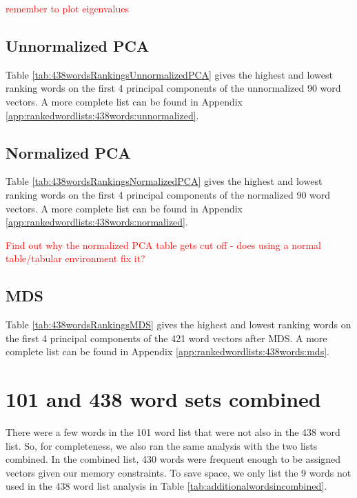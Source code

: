 \documentclass[10pt,letterpaper]{book}
\newcommand{\todo}[1]{\textcolor{red}{#1}}
\begin{document}
\todo{remember to plot eigenvalues}

\subsection{Unnormalized PCA}



Table \ref{tab:438wordsRankingsUnnormalizedPCA} gives the highest and lowest
ranking words on the first 4 principal components of the unnormalized 90 word 
vectors. A more complete list can be found in Appendix 
\ref{app:rankedwordlists:438words:unnormalized}.


\subsection{Normalized PCA}



Table \ref{tab:438wordsRankingsNormalizedPCA} gives the highest and lowest
ranking words on the first 4 principal components of the normalized 90 word 
vectors. A more complete list can be found in Appendix 
\ref{app:rankedwordlists:438words:normalized}.

\todo{Find out why the normalized PCA table gets cut off - does using a normal table/tabular environment fix it?}

\subsection{MDS}



Table \ref{tab:438wordsRankingsMDS} gives the highest and lowest
ranking words on the first 4 principal components of the 421 word 
vectors after MDS. A more complete list can be found in Appendix 
\ref{app:rankedwordlists:438words:mds}.

\section{101 and 438 word sets combined}

There were a few words in the 101 word list that were not also in the 438 word list. So, for completeness, we also ran the same analysis with the two lists combined. In the combined list, 430 words were frequent enough to be assigned vectors given our memory constraints. To save space, we only list the 9 words not used in the 438 word list analysis in Table \ref{tab:additionalwordsincombined}.
\end{document}
